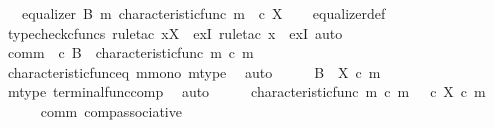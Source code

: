 \begin{isabellebody}
\ \ \ {\isachardoublequoteopen}equalizer\ B\ m\ {\isacharparenleft}{\kern0pt}characteristic{\isacharunderscore}{\kern0pt}func\ m{\isacharparenright}{\kern0pt}\ {\isacharparenleft}{\kern0pt}{\isasymt}\ {\isasymcirc}\isactrlsub c\ {\isasymbeta}\isactrlbsub X\isactrlesub {\isacharparenright}{\kern0pt}{\isachardoublequoteclose}\isanewline
%
\isadelimproof
\ \ %
\endisadelimproof
%
\isatagproof
{}\isamarkupfalse%
\ equalizer{\isacharunderscore}{\kern0pt}def\isanewline
{}\isamarkupfalse%
\ {\isacharparenleft}{\kern0pt}typecheck{\isacharunderscore}{\kern0pt}cfuncs{\isacharcomma}{\kern0pt}\ rule{\isacharunderscore}{\kern0pt}tac\ x{\isacharequal}{\kern0pt}{\isachardoublequoteopen}X{\isachardoublequoteclose}\ \ exI{\isacharcomma}{\kern0pt}\ rule{\isacharunderscore}{\kern0pt}tac\ x{\isacharequal}{\kern0pt}{\isachardoublequoteopen}{\isasymOmega}{\isachardoublequoteclose}\ \ exI{\isacharcomma}{\kern0pt}\ auto{\isacharparenright}{\kern0pt}\isanewline
\ \ \isamarkupfalse%
\ comm{\isacharcolon}{\kern0pt}\ {\isachardoublequoteopen}{\isasymt}\ {\isasymcirc}\isactrlsub c\ {\isasymbeta}\isactrlbsub B\isactrlesub \ {\isacharequal}{\kern0pt}\ characteristic{\isacharunderscore}{\kern0pt}func\ m\ {\isasymcirc}\isactrlsub c\ m{\isachardoublequoteclose}\isanewline
\ \ \ \ \isamarkupfalse%
\ characteristic{\isacharunderscore}{\kern0pt}func{\isacharunderscore}{\kern0pt}eq\ m{\isacharunderscore}{\kern0pt}mono\ m{\isacharunderscore}{\kern0pt}type\ \isamarkupfalse%
\ auto\isanewline
\ \ \isamarkupfalse%
\ \isamarkupfalse%
\ {\isachardoublequoteopen}{\isasymbeta}\isactrlbsub B\isactrlesub \ {\isacharequal}{\kern0pt}\ {\isasymbeta}\isactrlbsub X\isactrlesub \ {\isasymcirc}\isactrlsub c\ m{\isachardoublequoteclose}\isanewline
\ \ \ \ \isamarkupfalse%
\ m{\isacharunderscore}{\kern0pt}type\ terminal{\isacharunderscore}{\kern0pt}func{\isacharunderscore}{\kern0pt}comp\ \isamarkupfalse%
\ auto\isanewline
\ \ \isamarkupfalse%
\ \isamarkupfalse%
\ {\isachardoublequoteopen}characteristic{\isacharunderscore}{\kern0pt}func\ m\ {\isasymcirc}\isactrlsub c\ m\ {\isacharequal}{\kern0pt}\ {\isacharparenleft}{\kern0pt}{\isasymt}\ {\isasymcirc}\isactrlsub c\ {\isasymbeta}\isactrlbsub X\isactrlesub {\isacharparenright}{\kern0pt}\ {\isasymcirc}\isactrlsub c\ m{\isachardoublequoteclose}\isanewline
\ \ \ \ \isamarkupfalse%
\ comm\ comp{\isacharunderscore}{\kern0pt}associative{}\ \isamarkupfalse%

\end{isabellebody}
